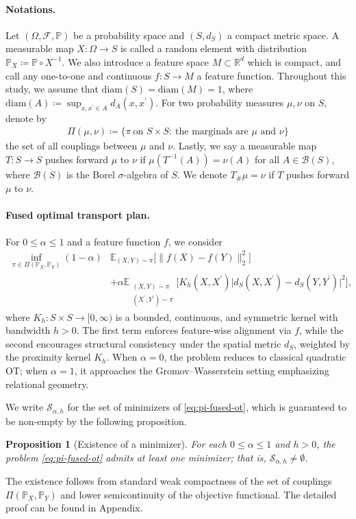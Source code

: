 \documentclass{article}
\newtheorem{proposition}{Proposition}
\begin{document}
\paragraph{Notations.}
Let $(\Omega,\mathcal{F},\mathbb{P})$ be a probability space and $(S,d_S)$ a compact metric space. 
A measurable map $X:\Omega\to S$ is called a random element with distribution $\mathbb{P}_X\coloneqq\mathbb{P}\circ X^{-1}$.
We also introduce a feature space $M\subset\mathbb{R}^d$ which is compact, and call any one-to-one and continuous $f:S\to M$ a feature function. Throughout this study, we assume that $\mathrm{diam}(S) = \mathrm{diam}(M) = 1$, where $\mathrm{diam}(A) \coloneqq \sup_{x,x^\prime \in A}d_A(x,x^\prime)$. For two probability measures $\mu,\nu$ on $S$, denote by
\begin{align*}
	\Pi(\mu,\nu) \coloneqq \{\pi\ \text{on }S\times S:\ \text{the marginals are }\mu\text{ and }\nu\}
\end{align*}
the set of all couplings between $\mu$ and $\nu$. Lastly, we say a measurable map $T: S \to S$ pushes forward $\mu$ to $\nu$ if $\mu(T^{-1}(A)) = \nu(A)$ for all $A \in \mathcal{B}(S)$, where $\mathcal{B}(S)$ is the Borel $\sigma$-algebra of $S$. We denote $T_{\#}\mu = \nu$ if $T$ pushes forward $\mu$ to $\nu$.

\paragraph{Fused optimal transport plan.}
For $0\le \alpha\le 1$ and a feature function $f$, we consider
\begin{align}
	\label{eq:pi-fused-ot}
	\inf_{\pi\in\Pi(\mathbb{P}_X,\mathbb{P}_Y)} 
	(1-\alpha)&\mathbb{E}_{(X,Y)\sim\pi}\big[\|f(X)-f(Y)\|_2^2\big] \nonumber\\
	&+ \alpha\mathbb{E}_{\substack{(X,Y)\sim\pi\\(X^\prime,Y^\prime)\sim\pi}}
	\Big[K_h(X,X^\prime) \big|d_S(X,X^\prime)-d_S(Y,Y^\prime)\big|^2\Big],
\end{align}
where $K_h:S\times S\to[0,\infty)$ is a bounded, continuous, and symmetric kernel with bandwidth $h > 0$. The first term enforces feature-wise alignment via $f$, while the second encourages structural consistency under the spatial metric $d_S$, weighted by the proximity kernel $K_h$. When $\alpha = 0$, the problem reduces to classical quadratic OT; when $\alpha = 1$, it approaches the Gromov–Wasserstein setting emphasizing relational geometry.

We write $\mathcal{S}_{\alpha,h}$ for the set of minimizers of \eqref{eq:pi-fused-ot}, which is guaranteed to be non-empty by the following proposition.
\begin{proposition}[Existence of a minimizer]
	\label{prop:existence}
	For each $0\le \alpha\le 1$ and $h > 0$, the problem \eqref{eq:pi-fused-ot} admits at least one minimizer; that is, $\mathcal{S}_{\alpha,h}\neq\emptyset$.
\end{proposition}
The existence follows from standard weak compactness of the set of couplings $\Pi(\mathbb{P}_X,\mathbb{P}_Y)$ and lower semicontinuity of the objective functional. The detailed proof can be found in Appendix. 
\end{document}
